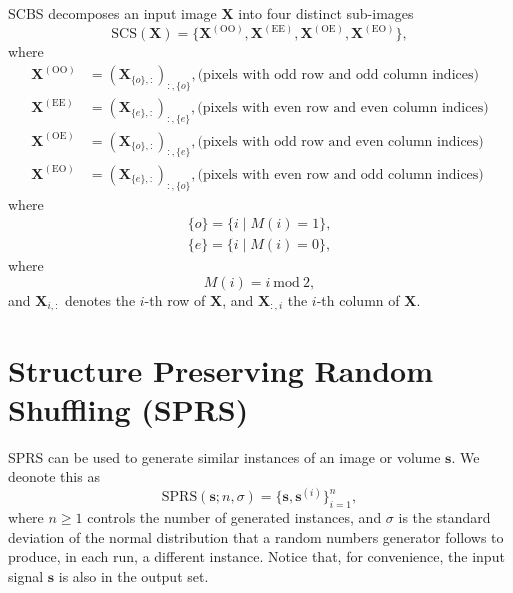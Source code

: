\documentclass{article}
\begin{document}
SCBS \cite{koho2019fourier} decomposes an input image $\mathbf{X}$
into four distinct sub-images
\begin{equation}
  \mathrm{SCS}(\mathbf{X}) = \{\mathbf{X}^{(\text{OO})}, \mathbf{X}^{(\text{EE})}, \mathbf{X}^{(\text{OE})}, \mathbf{X}^{(\text{EO})} \},
\end{equation}
where
\begin{align}
  \mathbf{X}^{(\text{OO})} & = (\mathbf{X}_{\{o\},:})_{:,\{o\}}, \text{(pixels with odd row and odd column indices)} \\
  \mathbf{X}^{(\text{EE})} & = (\mathbf{X}_{\{e\},:})_{:,\{e\}}, \text{(pixels with even row and even column indices)}\\
  \mathbf{X}^{(\text{OE})} & = (\mathbf{X}_{\{o\},:})_{:,\{e\}}, \text{(pixels with odd row and even column indices)}\\
  \mathbf{X}^{(\text{EO})} & = (\mathbf{X}_{\{e\},:})_{:,\{o\}}, \text{(pixels with even row and odd column indices)}
\end{align}
where
\begin{align}
  \{o\} = \{i\mid M(i)=1\}, \\
  \{e\} = \{i\mid M(i)=0\},
\end{align}
where
\begin{equation}
  M(i) = i~\text{mod}~2,
\end{equation}
and $\mathbf{X}_{i,:}$ denotes the $i$-th row of $\mathbf{X}$, and
$\mathbf{X}_{:,i}$ the $i$-th column of $\mathbf{X}$.


\section{Structure Preserving Random Shuffling (SPRS)}
\label{ape:SPRS}

SPRS can be used to generate similar instances of an image or volume
$\mathbf{s}$. We deonote this as
\begin{equation}
  \mathrm{SPRS}(\mathbf{s}; n, \sigma) = \{\mathbf{s}, \mathbf{s}^{(i)}\}_{i=1}^n,
\end{equation}
where $n\ge 1$ controls the number of generated instances, and
$\sigma$ is the standard deviation of the normal distribution that a
random numbers generator follows to produce, in each run, a different
instance. Notice that, for convenience, the input signal $\mathbf{s}$
is also in the output set.
\end{document}
